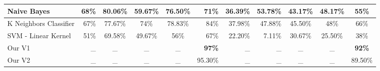 \documentclass[conference]{IEEEtran}
\begin{document}
\begin{table*}[]
\begin{tabular}{|l|r|c|c|c|r|r|r|c|c|c|}
Naive Bayes & 68\% & 80.06\% & 59.67\% & 76.50\% & 71\% & 36.39\% & 53.78\% & 43.17\% & 48.17\% & 55\% \\ \hline
K Neighbors Classifier & 67\% & 77.67\% & 74\% & 78.83\% & 84\% & 37.98\% & 47.88\% & 45.50\% & 48\% & 66\% \\ \hline
SVM - Linear Kernel & 51\% & 69.58\% & 49.67\% & 56\% & 67\% & 22.20\% & 7.11\% & 30.67\% & 25.50\% & 38\% \\ \hline
Our V1 & \_ & \_ & \_ & \_ & \textbf{97\%} & \_ & \_ & \_ & \_ & \textbf{92\%} \\ \hline
Our V2 & \_ & \_ & \_ & \_ & 95.30\% & \_ & \_ & \_ & \_ & 89.50\% \\ \hline
\end{tabular}
\end{table*}




\end{document}
